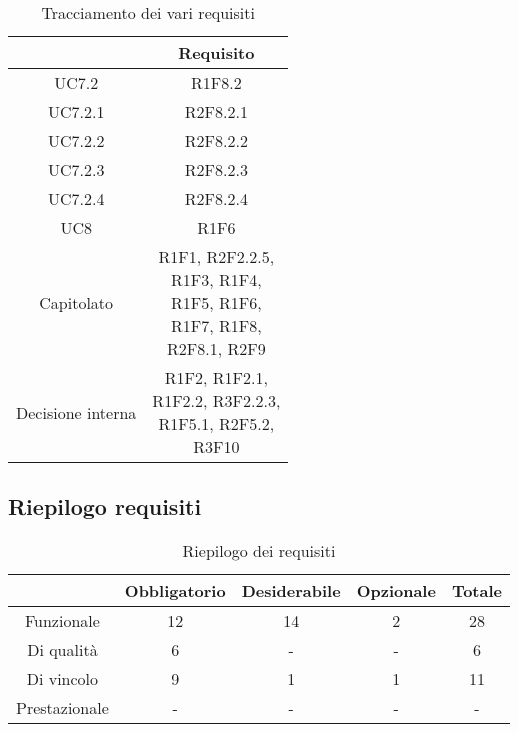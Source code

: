 \begin{table}[H]
	\centering
	\renewcommand{\arraystretch}{1.8}
	\begin{tabular}{c | c}
		\rowcolor[HTML]{125E28}
		\multicolumn{1}{c}{\color[HTML]{FFFFFF} \textbf{Fonte}} &
		\multicolumn{1}{c}{\color[HTML]{FFFFFF} \textbf{Requisito}} \\
		\hline
		UC7.2 & R1F8.2 \\ \hline
		UC7.2.1 & R2F8.2.1 \\ \hline
		UC7.2.2 & R2F8.2.2 \\ \hline
		UC7.2.3 & R2F8.2.3 \\ \hline
		UC7.2.4 & R2F8.2.4 \\ \hline
		UC8 & R1F6 \\ \hline
		Capitolato & \shortstack{R1F1, R2F2.2.5, \\R1F3, R1F4, \\R1F5, R1F6, \\R1F7, R1F8,\\ R2F8.1, R2F9}  \\ \hline
		Decisione interna & \shortstack{R1F2, R1F2.1,\\ R1F2.2, R3F2.2.3,\\ R1F5.1, R2F5.2,\\ R3F10} \\
	\end{tabular}
    \caption{Tracciamento dei vari requisiti}
\end{table}

\subsection{Riepilogo requisiti} \label{subsection: riepilogo}

\begin{table}[H]
    \centering
    \renewcommand{\arraystretch}{1.8}
    \begin{tabular}{c | c | c | c | c}
        \rowcolor[HTML]{125E28}
        \multicolumn{1}{c}{\color[HTML]{FFFFFF} \textbf{Tipologia}}     &
        \multicolumn{1}{c}{\color[HTML]{FFFFFF} \textbf{Obbligatorio}}  &
        \multicolumn{1}{c}{\color[HTML]{FFFFFF} \textbf{Desiderabile}}  &
        \multicolumn{1}{c}{\color[HTML]{FFFFFF} \textbf{Opzionale}}     &
        \multicolumn{1}{c}{\color[HTML]{FFFFFF} \textbf{Totale}}                                                                                                                      \\
        \hline
        Funzionale & 12 & 14 & 2 & 28 \\ \hline
        Di qualità & 6 & - & - & 6 \\ \hline
        Di vincolo & 9 & 1 & 1 & 11 \\ \hline
        Prestazionale & - & - & - & - \\
    \end{tabular}
    \caption{Riepilogo dei requisiti}
\end{table}